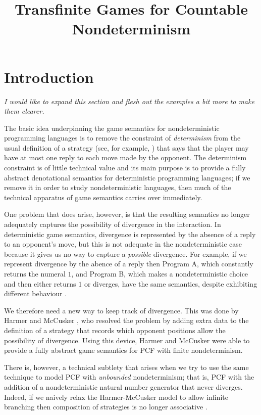 \documentclass{article}
\title{Transfinite Games for Countable Nondeterminism}
\begin{document}
\section{Introduction}

{\it I would like to expand this section and flesh out the examples a bit more to make them clearer.}

The basic idea underpinning the game semantics for nondeterministic programming languages is to remove the constraint of \emph{determinism} from the usual definition of a strategy (see, for example, \cite{abramskyjagadeesangames}) that says that the player may have at most one reply to each move made by the opponent.  The determinism constraint is of little technical value and its main purpose is to provide a fully abstract denotational semantics for deterministic programming languages; if we remove it in order to study nondeterministic languages, then much of the technical apparatus of game semantics carries over immediately.  

One problem that does arise, however, is that the resulting semantics no longer adequately captures the possibility of divergence in the interaction.  In deterministic game semantics, divergence is represented by the absence of a reply to an opponent's move, but this is not adequate in the nondeterministic case because it gives us no way to capture a \emph{possible} divergence.  For example, if we represent divergence by the abence of a reply then Program A, which constantly returns the numeral $1$, and Program B, which makes a nondeterministic choice and then either returns $1$ or diverges, have the same semantics, despite exhibiting different behaviour \cite{mcCHFiniteND}.

We therefore need a new way to keep track of divergence.  This was done by Harmer and McCusker \cite{mcCHFiniteND}, who resolved the problem by adding extra data to the definition of a strategy that records which opponent positions allow the possibility of divergence.  Using this device, Harmer and McCusker were able to provide a fully abstract game semantics for PCF with finite nondeterminism.

There is, however, a technical subtlety that arises when we try to use the same technique to model PCF with \emph{unbounded} nondeterminism; that is, PCF with the addition of a nondeterministic natural number generator that never diverges.  Indeed, if we naively relax the Harmer-McCusker model to allow infinite branching then composition of strategies is no longer associative \cite{RusssThesis}.  
\end{document}
